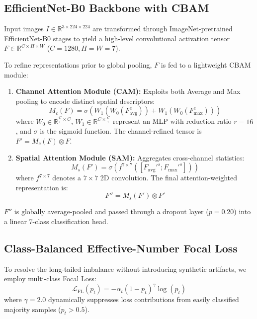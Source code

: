 \documentclass[conference]{IEEEtran}
\begin{document}
\subsection{EfficientNet-B0 Backbone with CBAM}
Input images $I \in \mathbb{R}^{3 \times 224 \times 224}$ are transformed through ImageNet-pretrained EfficientNet-B0 stages to yield a high-level convolutional activation tensor $F \in \mathbb{R}^{C \times H \times W}$ ($C=1280, H=W=7$).

To refine representations prior to global pooling, $F$ is fed to a lightweight CBAM module:
\begin{enumerate}
    \item \textbf{Channel Attention Module (CAM):} Exploits both Average and Max pooling to encode distinct spatial descriptors:
    \begin{equation}
        M_c(F) = \sigma\left(W_1(W_0(F_{\text{avg}}^c)) + W_1(W_0(F_{\text{max}}^c))\right)
    \end{equation}
    where $W_0 \in \mathbb{R}^{\frac{C}{r} \times C}$, $W_1 \in \mathbb{R}^{C \times \frac{C}{r}}$ represent an MLP with reduction ratio $r=16$, and $\sigma$ is the sigmoid function. The channel-refined tensor is $F' = M_c(F) \otimes F$.
    \item \textbf{Spatial Attention Module (SAM):} Aggregates cross-channel statistics:
    \begin{equation}
        M_s(F') = \sigma\left(f^{7\times 7}\left([F_{\text{avg}}'^s; F_{\text{max}}'^s]\right)\right)
    \end{equation}
    where $f^{7\times 7}$ denotes a $7 \times 7$ 2D convolution. The final attention-weighted representation is:
    \begin{equation}
        F'' = M_s(F') \otimes F'
    \end{equation}
\end{enumerate}
$F''$ is globally average-pooled and passed through a dropout layer ($p=0.20$) into a linear 7-class classification head.

\subsection{Class-Balanced Effective-Number Focal Loss}
To resolve the long-tailed imbalance without introducing synthetic artifacts, we employ multi-class Focal Loss:
\begin{equation}
    \mathcal{L}_{\text{FL}}(p_t) = -\alpha_t (1 - p_t)^\gamma \log(p_t)
\end{equation}
where $\gamma = 2.0$ dynamically suppresses loss contributions from easily classified majority samples ($p_t > 0.5$). 
\end{document}
